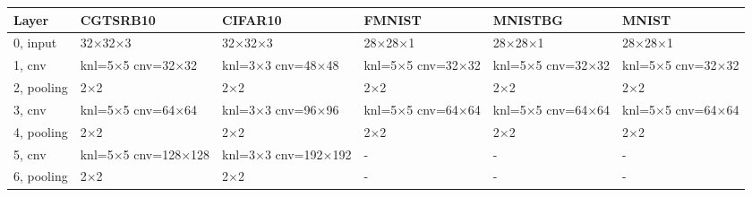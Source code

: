 \documentclass{article}
\begin{document}
\begin{table}
\centering
\begin{tabular}{llllll}
    \toprule
    Layer & CGTSRB10 & CIFAR10 & FMNIST & MNISTBG & MNIST \\
    \midrule
    0, input &
        32$\times$32$\times$3 &
        32$\times$32$\times$3 &
        28$\times$28$\times$1 &
        28$\times$28$\times$1 &
        28$\times$28$\times$1 \\
    \midrule

    1, cnv & 
        \makecell{knl=5$\times$5 \\ cnv=32$\times$32} & 
        \makecell{knl=3$\times$3 \\ cnv=48$\times$48} &
        \makecell{knl=5$\times$5 \\ cnv=32$\times$32} &
        \makecell{knl=5$\times$5 \\ cnv=32$\times$32} &
        \makecell{knl=5$\times$5 \\ cnv=32$\times$32} \\
    \midrule
    2, pooling &
        2$\times$2 &
        2$\times$2 &
        2$\times$2 &
        2$\times$2 &
        2$\times$2 \\
    \midrule

    3, cnv & 
       \makecell{knl=5$\times$5 \\ cnv=64$\times$64} & 
       \makecell{knl=3$\times$3 \\ cnv=96$\times$96} &
       \makecell{knl=5$\times$5 \\ cnv=64$\times$64} &
       \makecell{knl=5$\times$5 \\ cnv=64$\times$64} &
       \makecell{knl=5$\times$5 \\ cnv=64$\times$64} \\
    \midrule

    4, pooling &
        2$\times$2 &
        2$\times$2 &
        2$\times$2 &
        2$\times$2 &
        2$\times$2 \\
    \midrule

    5, cnv & 
       \makecell{knl=5$\times$5 \\ cnv=128$\times$128} & 
       \makecell{knl=3$\times$3 \\ cnv=192$\times$192} &
       - &
       - &
       - \\
    \midrule

    6, pooling &
        2$\times$2 &
        2$\times$2 &
        - &
        - &
        - \\
    \midrule
    

\end{tabular}
\end{table}
\end{document}

